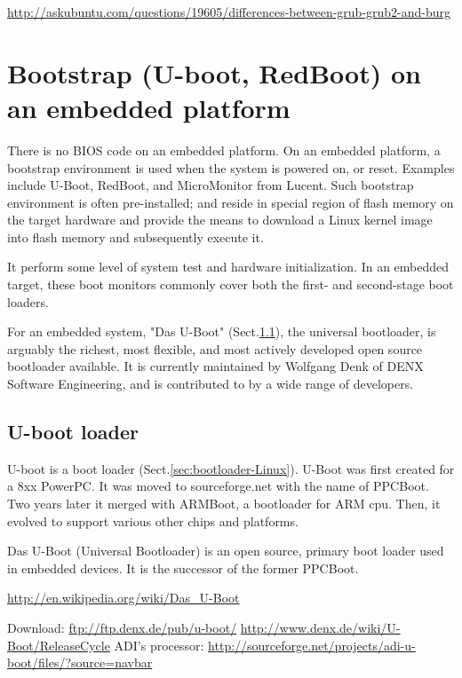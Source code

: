 \url{http://askubuntu.com/questions/19605/differences-between-grub-grub2-and-burg}

  
\section{Bootstrap (U-boot, RedBoot) on an embedded platform}
\label{sec:bootstrap-embedded-platform}

There is no BIOS code on an embedded platform.
On an embedded platform, a bootstrap environment is used when the system is
powered on, or reset. Examples include U-Boot, RedBoot, and MicroMonitor from Lucent. 
Such bootstrap environment is often pre-installed;
and reside in special region of flash memory on the target hardware and provide
the means to download a Linux kernel image into flash memory and subsequently execute it.

It perform some level of system test and hardware initialization.
In an embedded target, these boot monitors commonly cover both the first- and
second-stage boot loaders.

For an embedded system, "Das U-Boot" (Sect.\ref{sec:U-boot_loader}),  the
universal bootloader, is arguably the richest, most flexible, and most actively
developed open source bootloader available. It is currently maintained by
Wolfgang Denk of DENX Software Engineering, and is contributed to by a wide
range of developers.


\subsection{U-boot loader}
\label{sec:U-boot_loader}

U-boot is a boot loader (Sect.\ref{sec:bootloader-Linux}).
U-Boot was first created for a 8xx PowerPC. It was moved to sourceforge.net with
the name of PPCBoot. Two years later it merged with ARMBoot, a bootloader for
ARM cpu. Then, it evolved to support various other chips and platforms.

Das U-Boot (Universal Bootloader) is an open source, primary boot loader used in
embedded devices. It is the successor of the former PPCBoot.

\url{http://en.wikipedia.org/wiki/Das_U-Boot}

Download: \url{ftp://ftp.denx.de/pub/u-boot/}
\url{http://www.denx.de/wiki/U-Boot/ReleaseCycle}
ADI's processor: \url{http://sourceforge.net/projects/adi-u-boot/files/?source=navbar}

